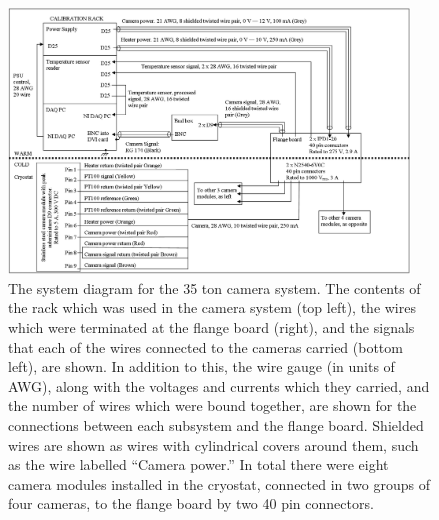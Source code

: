 \begin{figure}
  \centering
  \includegraphics[width=0.95\textwidth]{Camera_Block_diagram}
  \caption[The system diagram for the 35 ton camera system]
          {The system diagram for the 35 ton camera system. The contents of the rack which was used in the camera system (top left), the wires which were terminated at the flange board (right), and the signals that each of the wires connected to the cameras carried (bottom left), are shown. In addition to this, the wire gauge (in units of AWG), along with the voltages and currents which they carried, and the number of wires which were bound together, are shown for the connections between each subsystem and the flange board. Shielded wires are shown as wires with cylindrical covers around them, such as the wire labelled ``Camera power.'' In total there were eight camera modules installed in the cryostat, connected in two groups of four cameras, to the flange board by two 40 pin connectors.}
  \label{fig:CamSysDiagram}
\end{figure}

